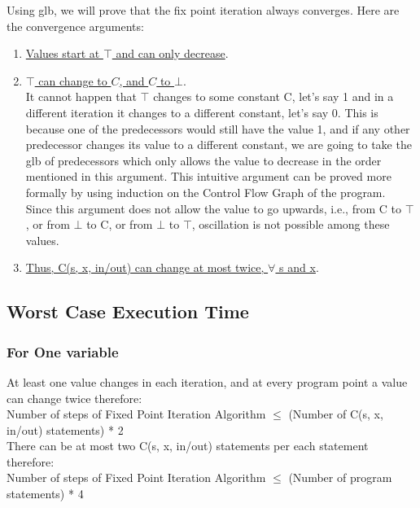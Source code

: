Using glb, we will prove that the fix point iteration always converges. Here are the convergence arguments:
\begin{enumerate}
    \item \underline{Values start at $\top$ and can only decrease}.
    \item \underline{$\top$ can change to $C$, and $C$ to $\bot$}.\\ 
    It cannot happen that $\top$ changes to some constant C, let's say 1 and in a different iteration it changes to a different constant, let's say 0. This is because one of the predecessors would still have the value 1, and if any other predecessor changes its value to a different constant, we are going to take the glb of predecessors which only allows the value to decrease in the order mentioned in this argument. This intuitive argument can be proved more formally by using induction on the Control Flow Graph of the program.\\
    Since this argument does not allow the value to go upwards, i.e., from C to $\top$, or from $\bot$ to C, or from $\bot$ to $\top$, oscillation is not possible among these values.
    \item \underline{Thus, C(s, x, in/out) can change at most twice, $\forall$ s and x}.
\end{enumerate}

\subsection{Worst Case Execution Time}
\subsubsection{For One variable}
At least one value changes in each iteration, and at every program point a value can change twice therefore:\\
Number of steps of Fixed Point Iteration Algorithm $\leq$ (Number of C(s, x, in/out) statements) * 2\\
There can be at most two C(s, x, in/out) statements per each statement therefore:\\
Number of steps of Fixed Point Iteration Algorithm $\leq$ (Number of program statements) * 4

